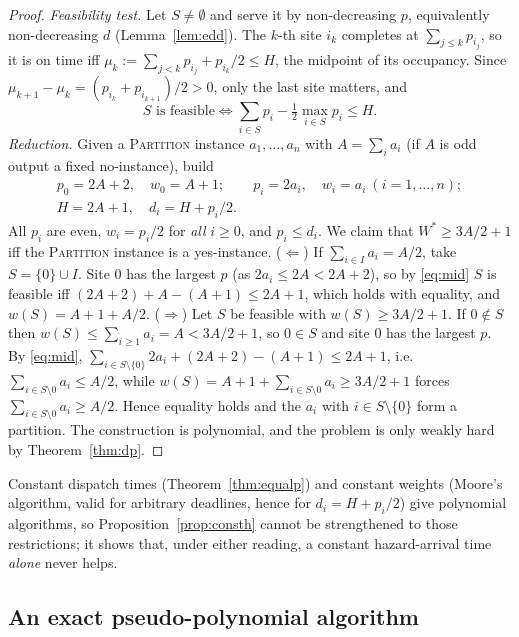 \documentclass[pdflatex,sn-mathphys-ay]{sn-jnl}
\theoremstyle{thmstyleone}
\theoremstyle{thmstyletwo}
\theoremstyle{thmstylethree}
\begin{document}
\begin{proof}
\emph{Feasibility test.} Let $S\neq\emptyset$ and serve it by
non-decreasing $p$, equivalently non-decreasing $d$
(Lemma~\ref{lem:edd}). The $k$-th site $i_k$ completes at
$\sum_{j\le k}p_{i_j}$, so it is on time iff
$\mu_k:=\sum_{j<k}p_{i_j}+p_{i_k}/2\le H$, the midpoint of its occupancy.
Since $\mu_{k+1}-\mu_k=(p_{i_k}+p_{i_{k+1}})/2>0$, only the last site
matters, and
\begin{equation}\label{eq:mid}
S\text{ is feasible}\iff \sum_{i\in S}p_i-\tfrac12\max_{i\in S}p_i\le H .
\end{equation}
\emph{Reduction.} Given a \textsc{Partition} instance $a_1,\dots,a_n$ with
$A=\sum_ia_i$ (if $A$ is odd output a fixed no-instance), build
\begin{gather*}
p_0=2A+2,\quad w_0=A+1;\qquad p_i=2a_i,\quad w_i=a_i\ (i=1,\dots,n);\\
H=2A+1,\quad d_i=H+p_i/2 .
\end{gather*}
All $p_i$ are even, $w_i=p_i/2$ for \emph{all} $i\ge0$, and $p_i\le d_i$.
We claim that $W^\ast\ge 3A/2+1$ iff the \textsc{Partition} instance is a
yes-instance. ($\Leftarrow$) If $\sum_{i\in I}a_i=A/2$, take
$S=\{0\}\cup I$. Site $0$ has the largest $p$ (as $2a_i\le 2A<2A+2$), so by
\eqref{eq:mid} $S$ is feasible iff $(2A+2)+A-(A+1)\le 2A+1$, which holds
with equality, and $w(S)=A+1+A/2$. ($\Rightarrow$) Let $S$ be feasible with
$w(S)\ge 3A/2+1$. If $0\notin S$ then $w(S)\le\sum_{i\ge1}a_i=A<3A/2+1$,
so $0\in S$ and site $0$ has the largest $p$. By \eqref{eq:mid},
$\sum_{i\in S\setminus\{0\}}2a_i+(2A+2)-(A+1)\le 2A+1$, i.e.\
$\sum_{i\in S\setminus 0}a_i\le A/2$, while
$w(S)=A+1+\sum_{i\in S\setminus0}a_i\ge 3A/2+1$ forces
$\sum_{i\in S\setminus0}a_i\ge A/2$. Hence equality holds and the
$a_i$ with $i\in S\setminus\{0\}$ form a partition. The construction is
polynomial, and the problem is only weakly hard by Theorem~\ref{thm:dp}.
\end{proof}

Constant dispatch times (Theorem~\ref{thm:equalp}) and constant weights
(Moore's algorithm, valid for arbitrary deadlines, hence for
$d_i=H+p_i/2$) give polynomial algorithms, so
Proposition~\ref{prop:consth} cannot be strengthened to those
restrictions; it shows that, under either reading, a constant
hazard-arrival time \emph{alone} never helps.

\subsection{An exact pseudo-polynomial algorithm}
\end{document}
